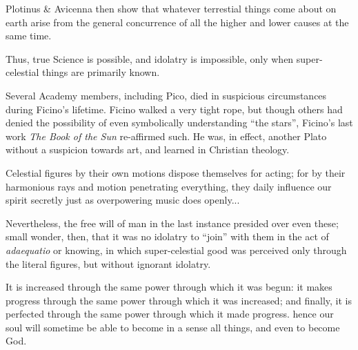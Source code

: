 \begin{quotex}
Plotinus \& Avicenna then show that whatever terrestial things come about on earth arise from the general concurrence of all the higher and lower causes at the same time.
\end{quotex}


Thus, true Science is possible, and idolatry is impossible, only when super-celestial things are primarily known.

Several Academy members, including Pico, died in suspicious circumstances during Ficino's lifetime. Ficino walked a very tight rope, but though others had denied the possibility of even symbolically understanding ``the stars'', Ficino's last work \emph{The Book of the Sun} re-affirmed such. He was, in effect, another Plato without a suspicion towards art, and learned in Christian theology.

\begin{quotex}
Celestial figures by their own motions dispose themselves for acting; for by their harmonious rays and motion penetrating everything, they daily influence our spirit secretly just as overpowering music does openly...
\end{quotex}


Nevertheless, the free will of man in the last instance presided over even these; small wonder, then, that it was no idolatry to ``join'' with them in the act of \emph{adaequatio} or knowing, in which super-celestial good was perceived only through the literal figures, but without ignorant idolatry.

\begin{quotex}
It is increased through the same power through which it was begun: it makes progress through the same power through which it was increased; and finally, it is perfected through the same power through which it made progress. hence our soul will sometime be able to become in a sense all things, and even to become God.
\end{quotex}




